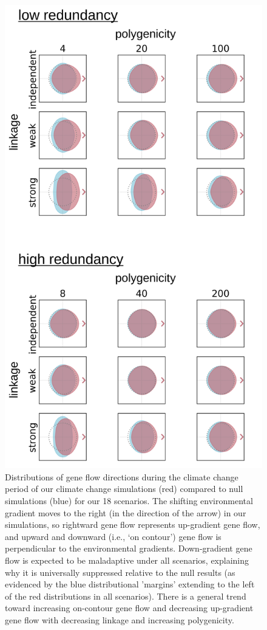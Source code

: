 \documentclass[9pt,twocolumn,twoside,lineno]{new_article}
\begin{document}
\begin{figure}
\centering
\includegraphics[width=.8\linewidth]{pub/figs_and_stats/FIG_2_gene_flow.png}
    \caption{Distributions of gene flow directions during the climate change period of our climate change simulations (red) compared to null simulations (blue) for our 18 scenarios.  The shifting environmental gradient moves to the right (in the direction of the arrow) in our simulations, so rightward gene flow represents up-gradient gene flow, and upward and downward (i.e., `on contour’) gene flow is perpendicular to the environmental gradients. Down-gradient gene flow is expected to be maladaptive under all scenarios, explaining why it is universally suppressed relative to the null results (as evidenced by the blue distributional 'margins' extending to the left of the red distributions in all scenarios). There is a general trend toward increasing on-contour gene flow and decreasing up-gradient gene flow with decreasing linkage and increasing polygenicity.
}
\label{fig:fig_2}
\end{figure}
\end{document}
